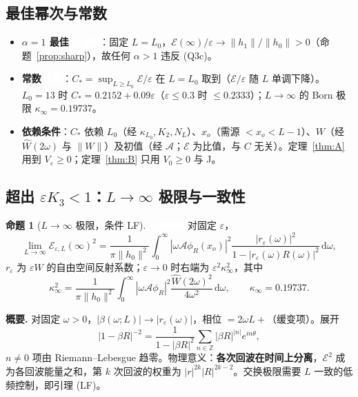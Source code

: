 \documentclass[11pt,a4paper,fontset=windows]{ctexart}
\newcommand{\tagbox}[2]{\begingroup\setlength{\fboxsep}{1.4pt}\colorbox{#1}{\textcolor{white}{\footnotesize\bfseries #2}}\endgroup}
\newcommand{\proven}{\tagbox{green!45!black}{已证明}}
\newcommand{\sketch}{\tagbox{teal!80!black}{证明概要}}
\newcommand{\numer}{\tagbox{orange!85!black}{数值}}
\theoremstyle{definition}
\newtheorem{proposition}{命题}
\theoremstyle{definition}
\newcommand{\eps}{\varepsilon}
\newcommand{\cE}{\mathcal E}
\newcommand{\cA}{\mathcal A}
\newcommand{\dd}{\mathrm d}
\begin{document}
\subsection{最佳幂次与常数}
\begin{itemize}
\item \textbf{$\alpha=1$ 最佳}\,\proven：固定 $L=L_0$，$\cE(\infty)/\eps\to\|h_1\|/\|h_0\|>0$（命题~\ref{prop:sharp}），故任何 $\alpha>1$ 违反 (Q3c)。
\item \textbf{常数}\,\numer：$C_*=\sup_{L\ge L_0}\cE/\eps$ 在 $L=L_0$ 取到（$\cE/\eps$ 随 $L$ 单调下降）。$L_0=13$ 时 $C_*=0.2152+0.09\eps$（$\eps\le0.3$ 时 $\le0.2333$）；$L\to\infty$ 的 Born 极限 $\kappa_\infty=0.19737$。
\item \textbf{依赖条件}：$C_*$ 依赖 $L_0$（经 $\kappa_{L_0},K_2,N_L$）、$x_o$（需源 $<x_o<L-1$）、$W$（经 $\hat W(2\omega)$ 与 $\|W\|$）及初值（经 $\cA$；$\cE$ 为比值，与 $C$ 无关）。定理~\ref{thm:A} 用到 $V_\eps\ge0$；定理~\ref{thm:B} 只用 $V_0\ge0$ 与 J。
\end{itemize}

\subsection[\texorpdfstring{超出 $\eps K_3<1$：$L\to\infty$ 极限与一致性}{超出 εK3<1：L→∞ 极限与一致性}]{超出 $\eps K_3<1$：$L\to\infty$ 极限与一致性}
\begin{proposition}[$L\to\infty$ 极限，条件 LF]\label{prop:Linf}\sketch\enspace 对固定 $\eps$，
\[
\lim_{L\to\infty}\cE_{\eps,L}(\infty)^2=\frac{1}{\pi\|h_0\|^2}\int_0^\infty|\omega\cA\phi_R(x_o)|^2\frac{|r_\eps(\omega)|^2}{1-|r_\eps(\omega)R(\omega)|^2}\,\dd\omega,
\]
$r_\eps$ 为 $\eps W$ 的自由空间反射系数；$\eps\to0$ 时右端为 $\eps^2\kappa_\infty^2$，其中
\[\kappa_\infty^2=\frac{1}{\pi\|h_0\|^2}\int_0^\infty|\omega\cA\phi_R|^2\frac{\hat W(2\omega)^2}{4\omega^2}\,\dd\omega,\qquad \kappa_\infty=0.19737 .\]
\end{proposition}
\noindent\textbf{概要.} 对固定 $\omega>0$，$|\beta(\omega;L)|\to|r_\eps(\omega)|$，相位 $=2\omega L+$（缓变项）。展开
\[|1-\beta R|^{-2}=\frac{1}{1-|\beta R|^2}\sum_{n\in\mathbb Z}|\beta R|^{|n|}e^{in\theta},\]
$n\ne0$ 项由 Riemann--Lebesgue 趋零。物理意义：\textbf{各次回波在时间上分离}，$\cE^2$ 成为各回波能量之和，第 $k$ 次回波的权重为 $|r|^{2k}|R|^{2k-2}$。交换极限需要 $L$ 一致的低频控制，即引理 (LF)。
\end{document}
